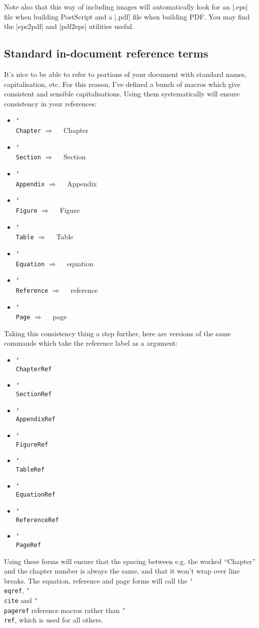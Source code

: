 \documentclass[12pt]{article}
\newcommand{\manifestsAs}{\ensuremath{\Rightarrow\quad}\xspace}
\newcommand{\texcmd}[1]{\texttt{\char`\\#1}}
\begin{document}
Note also that this way of including images will automatically look for an
|.eps| file when building PostScript and a |.pdf| file when building PDF. You
may find the |eps2pdf| and |pdf2eps| utilities useful.

\subsection{Standard in-document reference terms}
It's nice to be able to refer to portions of your document with standard names,
capitalisation, etc. For this reason, I've defined a bunch of macros which give
consistent and sensible capitalisations. Using them systematically will ensure
consistency in your references:
%
\begin{itemize}
\item \texcmd{Chapter} \manifestsAs Chapter
\item \texcmd{Section} \manifestsAs Section
\item \texcmd{Appendix} \manifestsAs Appendix
\item \texcmd{Figure} \manifestsAs Figure
\item \texcmd{Table} \manifestsAs Table
\item \texcmd{Equation} \manifestsAs equation
\item \texcmd{Reference} \manifestsAs reference
\item \texcmd{Page} \manifestsAs page
\end{itemize}

Taking this consistency thing a step further, here are versions of the same
commands which take the reference label as a argument:
%
\begin{itemize}
\item \texcmd{ChapterRef}
\item \texcmd{SectionRef}
\item \texcmd{AppendixRef}
\item \texcmd{FigureRef}
\item \texcmd{TableRef}
\item \texcmd{EquationRef}
\item \texcmd{ReferenceRef}
\item \texcmd{PageRef}
\end{itemize}
%
Using these forms will ensure that the spacing between e.g. the worked
``Chapter'' and the chapter number is always the same, and that it won't wrap
over line breaks. The equation, reference and page forms will call the
\texcmd{eqref}, \texcmd{cite} and \texcmd{pageref} reference macros rather than
\texcmd{ref}, which is used for all others.
\end{document}
